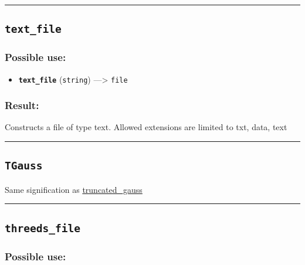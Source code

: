 \documentclass[]{book}
\providecommand{\tightlist}{%
  \setlength{\itemsep}{0pt}\setlength{\parskip}{0pt}}
\theoremstyle{definition}
\theoremstyle{definition}
\theoremstyle{definition}
\theoremstyle{remark}
\begin{document}
\begin{center}\rule{0.5\linewidth}{\linethickness}\end{center}

\subsection{\texorpdfstring{\texttt{text\_file}}{text\_file}}\label{text_file}

\subsubsection{Possible use:}\label{possible-use-517}

\begin{itemize}
\tightlist
\item
  \textbf{\texttt{text\_file}} (\texttt{string}) ---\textgreater{}
  \texttt{file}
\end{itemize}

\subsubsection{Result:}\label{result-500}

Constructs a file of type text. Allowed extensions are limited to txt,
data, text

\begin{center}\rule{0.5\linewidth}{\linethickness}\end{center}

\subsection{\texorpdfstring{\texttt{TGauss}}{TGauss}}\label{tgauss}

Same signification as
\href{OperatorsSZ\#truncated_gauss}{truncated\_gauss}

\begin{center}\rule{0.5\linewidth}{\linethickness}\end{center}

\subsection{\texorpdfstring{\texttt{threeds\_file}}{threeds\_file}}\label{threeds_file}

\subsubsection{Possible use:}\label{possible-use-518}
\end{document}
